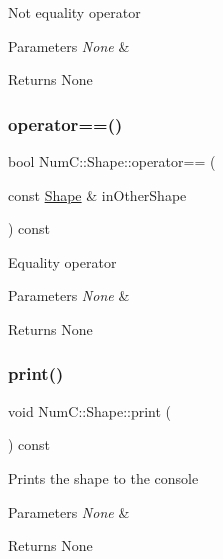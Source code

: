 Not equality operator


\begin{DoxyParams}{Parameters}
{\em None} & \\
\hline
\end{DoxyParams}
\begin{DoxyReturn}{Returns}
None 
\end{DoxyReturn}
\mbox{\label{class_num_c_1_1_shape_a34bc152092e6040854c38b318cb33771}} 
\subsubsection{\texorpdfstring{operator==()}{operator==()}}
{\footnotesize\ttfamily bool Num\+C\+::\+Shape\+::operator== (\begin{DoxyParamCaption}\item[{const \mbox{\hyperlink{class_num_c_1_1_shape}{Shape}} \&}]{in\+Other\+Shape }\end{DoxyParamCaption}) const\hspace{0.3cm}{\ttfamily [inline]}}

Equality operator


\begin{DoxyParams}{Parameters}
{\em None} & \\
\hline
\end{DoxyParams}
\begin{DoxyReturn}{Returns}
None 
\end{DoxyReturn}
\mbox{\label{class_num_c_1_1_shape_a4a1fe464c014b1af25c24a5de9621761}} 
\subsubsection{\texorpdfstring{print()}{print()}}
{\footnotesize\ttfamily void Num\+C\+::\+Shape\+::print (\begin{DoxyParamCaption}{ }\end{DoxyParamCaption}) const\hspace{0.3cm}{\ttfamily [inline]}}

Prints the shape to the console


\begin{DoxyParams}{Parameters}
{\em None} & \\
\hline
\end{DoxyParams}
\begin{DoxyReturn}{Returns}
None 
\end{DoxyReturn}
\mbox{\label{class_num_c_1_1_shape_aa143f614d1c367b7ecbf57e287ab08dd}} 
